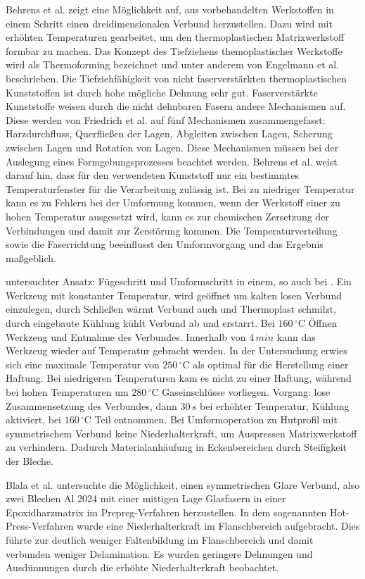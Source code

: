 Behrens et al. \cite{Behrens.2014} zeigt eine Möglichkeit auf, aus vorbehandelten Werkstoffen in einem Schritt einen dreidimensionalen Verbund herzustellen. Dazu wird mit erhöhten Temperaturen gearbeitet, um den thermoplastischen Matrixwerkstoff formbar zu machen. Das Konzept des Tiefziehens themoplastischer Werkstoffe wird als Thermoforming bezeichnet und unter anderem von Engelmann et al. \cite{Engelmann.2012} beschrieben. 
Die Tiefziehfähigkeit von nicht faserverstärkten thermoplastischen Kunststoffen ist durch hohe mögliche Dehnung sehr gut. Faserverstärkte Kunststoffe weisen durch die nicht dehnbaren Fasern andere Mechanismen auf. Diese werden von Friedrich et al. \cite{Friedrich.1997} auf fünf Mechanismen zusammengefasst: Harzdurchfluss, Querfließen der Lagen, Abgleiten zwischen Lagen, Scherung zwischen Lagen und Rotation von Lagen. Diese Mechanismen müssen bei der Auslegung eines Formgebungsprozesses beachtet werden. 
Behrens et al. \cite{Behrens.2014} weist darauf hin, dass für den verwendeten Kunststoff nur ein bestimmtes Temperaturfenster für die Verarbeitung zulässig ist. Bei zu niedriger Temperatur kann es zu Fehlern bei der Umformung kommen, wenn der Werkstoff einer zu hohen Temperatur ausgesetzt wird, kann es zur chemischen Zersetzung der Verbindungen und damit zur Zerstörung kommen. Die Temperaturverteilung sowie die Faserrichtung beeinflusst den Umformvorgang und das Ergebnis maßgeblich. 

untersuchter Ansatz: Fügeschritt und Umformschritt in einem, so auch bei \cite{BerndArno.2017}. Ein Werkzeug mit konstanter Temperatur, wird geöffnet um kalten losen Verbund einzulegen, durch Schließen wärmt Verbund auch und Thermoplast schmilzt, durch eingebaute Kühlung kühlt Verbund ab und erstarrt. Bei $160 \, ^\circ \text{C}$ Öffnen Werkzeug und Entnahme des Verbundes. Innerhalb von $4\, min$ kann das Werkzeug wieder auf Temperatur gebracht werden.
In der Untersuchung erwies sich eine maximale Temperatur von $250 \, ^\circ \text{C}$ als optimal für die Herstellung einer Haftung. Bei niedrigeren Temperaturen kam es nicht zu einer Haftung, während bei hohen Temperaturen um $280 \, ^\circ \text{C}$ Gaseinschlüsse vorliegen. 
Vorgang: lose Zusammensetzung des Verbundes, dann $30 \, s$ bei erhöhter Temperatur, Kühlung aktiviert, bei $160 \, ^\circ \text{C}$ Teil entnommen.
Bei Umformoperation zu Hutprofil mit symmetrischem Verbund keine Niederhalterkraft, um Auspressen Matrixwerkstoff zu verhindern. Dadurch Materialanhäufung in Eckenbereichen durch Steifigkeit der Bleche.

Blala et al. \cite{Blala.2021} untersuchte die Möglichkeit, einen symmetrischen Glare Verbund, also zwei Blechen Al 2024 mit einer mittigen Lage Glasfasern in einer Epoxidharzmatrix im Prepreg-Verfahren herzustellen. In dem sogenannten Hot-Press-Verfahren wurde eine Niederhalterkraft im Flanschbereich aufgebracht. Dies führte zur deutlich weniger Faltenbildung im Flanschbereich und damit verbunden weniger Delamination. Es wurden geringere Dehnungen und Ausdünnungen durch die erhöhte Niederhalterkraft beobachtet.

